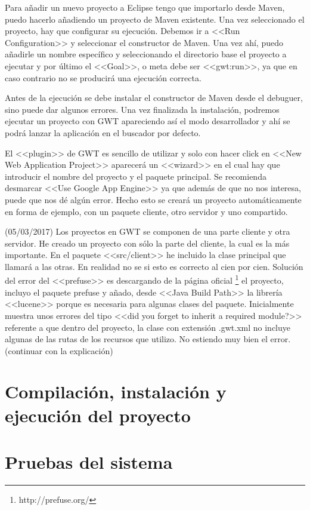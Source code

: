 Para añadir un nuevo proyecto a Eclipse tengo que importarlo desde Maven, puedo hacerlo añadiendo un proyecto de Maven existente. Una vez seleccionado el proyecto, hay que configurar su ejecución. Debemos ir a <<Run Configuration>> y seleccionar el constructor de Maven. Una vez ahí, puedo añadirle un nombre específico y seleccionando el directorio base el proyecto a ejecutar y por último el <<Goal>>, o meta debe ser <<gwt:run>>, ya que en caso contrario no se producirá una ejecución correcta.

Antes de la ejecución se debe instalar el constructor de Maven desde el debuguer, sino puede dar algunos errores. Una vez finalizada la instalación, podremos ejecutar un proyecto con GWT apareciendo así el modo desarrollador y ahí se podrá lanzar la aplicación en el buscador por defecto.

El <<plugin>> de GWT es sencillo de utilizar y solo con hacer click en <<New Web Application Project>> aparecerá un <<wizard>> en el cual hay que introducir el nombre del proyecto y el paquete principal. Se recomienda desmarcar <<Use Google App Engine>> ya que además de que no nos interesa, puede que nos dé algún error. Hecho esto se creará un proyecto automáticamente en forma de ejemplo, con un paquete cliente, otro servidor y uno compartido.


(05/03/2017)
Los proyectos en GWT se componen de una parte cliente y otra servidor. He creado un proyecto con sólo la parte del cliente, la cual es la más importante. En el paquete <<src/client>> he incluido la clase principal que llamará a las otras. En realidad no se si esto es correcto al cien por cien.
Solución del error del  <<prefuse>> es descargando de la página oficial \footnote{http://prefuse.org/} el proyecto, incluyo el paquete prefuse y añado, desde <<Java Build Path>> la librería  <<lucene>> porque es necesaria para algunas clases del paquete. Inicialmente muestra unos errores del tipo <<did you forget to inherit a required module?>> referente a que dentro del proyecto, la clase con extensión .gwt.xml no incluye algunas de las rutas de los recursos que utilizo. No estiendo muy bien el error. (continuar con la explicación)



\section{Compilación, instalación y ejecución del proyecto}

\section{Pruebas del sistema}
